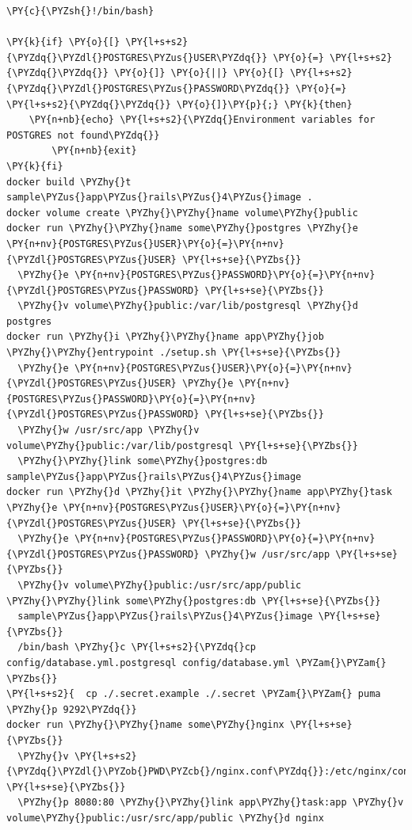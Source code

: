 \begin{codelisting}
\label{code:scriptdocker}
\begin{Verbatim}[fontsize=\relsize{-2.5},fontseries=b,commandchars=\\\{\}]
\PY{c}{\PYZsh{}!/bin/bash}

\PY{k}{if} \PY{o}{[} \PY{l+s+s2}{\PYZdq{}\PYZdl{}POSTGRES\PYZus{}USER\PYZdq{}} \PY{o}{=} \PY{l+s+s2}{\PYZdq{}\PYZdq{}} \PY{o}{]} \PY{o}{||} \PY{o}{[} \PY{l+s+s2}{\PYZdq{}\PYZdl{}POSTGRES\PYZus{}PASSWORD\PYZdq{}} \PY{o}{=} \PY{l+s+s2}{\PYZdq{}\PYZdq{}} \PY{o}{]}\PY{p}{;} \PY{k}{then}
	\PY{n+nb}{echo} \PY{l+s+s2}{\PYZdq{}Environment variables for POSTGRES not found\PYZdq{}}
        \PY{n+nb}{exit}
\PY{k}{fi}
docker build \PYZhy{}t sample\PYZus{}app\PYZus{}rails\PYZus{}4\PYZus{}image .
docker volume create \PYZhy{}\PYZhy{}name volume\PYZhy{}public
docker run \PYZhy{}\PYZhy{}name some\PYZhy{}postgres \PYZhy{}e \PY{n+nv}{POSTGRES\PYZus{}USER}\PY{o}{=}\PY{n+nv}{\PYZdl{}POSTGRES\PYZus{}USER} \PY{l+s+se}{\PYZbs{}}
  \PYZhy{}e \PY{n+nv}{POSTGRES\PYZus{}PASSWORD}\PY{o}{=}\PY{n+nv}{\PYZdl{}POSTGRES\PYZus{}PASSWORD} \PY{l+s+se}{\PYZbs{}}
  \PYZhy{}v volume\PYZhy{}public:/var/lib/postgresql \PYZhy{}d postgres
docker run \PYZhy{}i \PYZhy{}\PYZhy{}name app\PYZhy{}job \PYZhy{}\PYZhy{}entrypoint ./setup.sh \PY{l+s+se}{\PYZbs{}}
  \PYZhy{}e \PY{n+nv}{POSTGRES\PYZus{}USER}\PY{o}{=}\PY{n+nv}{\PYZdl{}POSTGRES\PYZus{}USER} \PYZhy{}e \PY{n+nv}{POSTGRES\PYZus{}PASSWORD}\PY{o}{=}\PY{n+nv}{\PYZdl{}POSTGRES\PYZus{}PASSWORD} \PY{l+s+se}{\PYZbs{}}
  \PYZhy{}w /usr/src/app \PYZhy{}v volume\PYZhy{}public:/var/lib/postgresql \PY{l+s+se}{\PYZbs{}}
  \PYZhy{}\PYZhy{}link some\PYZhy{}postgres:db sample\PYZus{}app\PYZus{}rails\PYZus{}4\PYZus{}image
docker run \PYZhy{}d \PYZhy{}it \PYZhy{}\PYZhy{}name app\PYZhy{}task \PYZhy{}e \PY{n+nv}{POSTGRES\PYZus{}USER}\PY{o}{=}\PY{n+nv}{\PYZdl{}POSTGRES\PYZus{}USER} \PY{l+s+se}{\PYZbs{}}
  \PYZhy{}e \PY{n+nv}{POSTGRES\PYZus{}PASSWORD}\PY{o}{=}\PY{n+nv}{\PYZdl{}POSTGRES\PYZus{}PASSWORD} \PYZhy{}w /usr/src/app \PY{l+s+se}{\PYZbs{}}
  \PYZhy{}v volume\PYZhy{}public:/usr/src/app/public \PYZhy{}\PYZhy{}link some\PYZhy{}postgres:db \PY{l+s+se}{\PYZbs{}}
  sample\PYZus{}app\PYZus{}rails\PYZus{}4\PYZus{}image \PY{l+s+se}{\PYZbs{}}
  /bin/bash \PYZhy{}c \PY{l+s+s2}{\PYZdq{}cp config/database.yml.postgresql config/database.yml \PYZam{}\PYZam{} \PYZbs{}}
\PY{l+s+s2}{  cp ./.secret.example ./.secret \PYZam{}\PYZam{} puma \PYZhy{}p 9292\PYZdq{}}
docker run \PYZhy{}\PYZhy{}name some\PYZhy{}nginx \PY{l+s+se}{\PYZbs{}}
  \PYZhy{}v \PY{l+s+s2}{\PYZdq{}\PYZdl{}\PYZob{}PWD\PYZcb{}/nginx.conf\PYZdq{}}:/etc/nginx/conf.d/default.conf \PY{l+s+se}{\PYZbs{}}
  \PYZhy{}p 8080:80 \PYZhy{}\PYZhy{}link app\PYZhy{}task:app \PYZhy{}v volume\PYZhy{}public:/usr/src/app/public \PYZhy{}d nginx
\end{Verbatim}
\end{codelisting}

